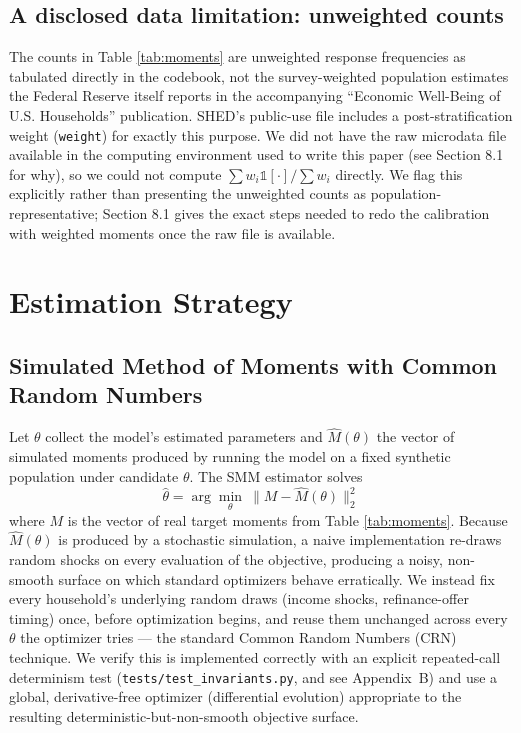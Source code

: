 \documentclass[12pt]{article}
\begin{document}
\subsection{A disclosed data limitation: unweighted counts}

The counts in Table \ref{tab:moments} are unweighted response frequencies as tabulated directly in the codebook, not the survey-weighted population estimates the Federal Reserve itself reports in the accompanying ``Economic Well-Being of U.S. Households'' publication. SHED's public-use file includes a post-stratification weight (\texttt{weight}) for exactly this purpose. We did not have the raw microdata file available in the computing environment used to write this paper (see Section 8.1 for why), so we could not compute $\sum w_i \mathbb{1}[\cdot] / \sum w_i$ directly. We flag this explicitly rather than presenting the unweighted counts as population-representative; Section 8.1 gives the exact steps needed to redo the calibration with weighted moments once the raw file is available.

\section{Estimation Strategy}

\subsection{Simulated Method of Moments with Common Random Numbers}

Let $\theta$ collect the model's estimated parameters and $\hat M(\theta)$ the vector of simulated moments produced by running the model on a fixed synthetic population under candidate $\theta$. The SMM estimator solves
\begin{equation}
    \hat\theta = \arg\min_\theta \ \lVert M - \hat M(\theta) \rVert_2^2
\end{equation}
where $M$ is the vector of real target moments from Table \ref{tab:moments}. Because $\hat M(\theta)$ is produced by a stochastic simulation, a naive implementation re-draws random shocks on every evaluation of the objective, producing a noisy, non-smooth surface on which standard optimizers behave erratically. We instead fix every household's underlying random draws (income shocks, refinance-offer timing) once, before optimization begins, and reuse them unchanged across every $\theta$ the optimizer tries — the standard Common Random Numbers (CRN) technique. We verify this is implemented correctly with an explicit repeated-call determinism test (\texttt{tests/test\_invariants.py}, and see Appendix~B) and use a global, derivative-free optimizer (differential evolution) appropriate to the resulting deterministic-but-non-smooth objective surface.
\end{document}
